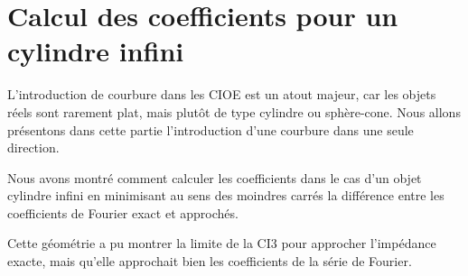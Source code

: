 \chapter{Calcul des coefficients pour un cylindre infini}
\label{sec:cylindre}
\minitoc
\newpage
{}
L'introduction de courbure dans les CIOE est un atout majeur, car les objets réels sont rarement plat, mais plutôt de type cylindre ou sphère-cone. Nous allons présentons dans cette partie l'introduction d'une courbure dans une seule direction.






Nous avons montré comment calculer les coefficients dans le cas d'un objet cylindre infini en minimisant au sens des moindres carrés la différence entre les coefficients de Fourier exact et approchés. 

Cette géométrie a pu montrer la limite de la CI3 pour approcher l'impédance exacte, mais qu'elle approchait bien les coefficients de la série de Fourier.
